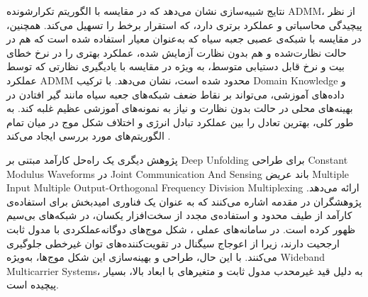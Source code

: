 نتایج شبیه‌سازی نشان می‌دهد که 
در مقایسه با الگوریتم تکرارشونده 
\gls{ADMM}،
از نظر پیچیدگی محاسباتی و عملکرد برتری دارد، که استقرار برخط را تسهیل می‌کند. همچنین، در مقایسه با شبکه‌ی عصبی جعبه سیاه که به‌عنوان معیار استفاده شده است که هم در حالت نظارت‌شده و هم بدون نظارت آزمایش شده،
عملکرد بهتری را در نرخ خطای بیت و نرخ قابل دستیابی متوسط، به ویژه در مقایسه با یادیگیری نظارتی که توسط عملکرد 
\gls{ADMM}
محدود شده است، نشان می‌دهد.
با ترکیب 
\gls{Domain Knowledge}
و داده‌های آموزشی، می‌تواند بر نقاط ضعف شبکه‌های جعبه سیاه مانند گیر افتادن در بهینه‌های محلی در حالت بدون نظارت و نیاز به نمونه‌های آموزشی عظیم غلبه کند. به طور کلی،
بهترین تعادل را بین عملکرد تبادل 
انرژی و اختلاف شکل موج در میان تمام الگوریتم‌های مورد بررسی ایجاد می‌کند
\cite{JointDesign}.

	پژوهش دیگری یک راه‌حل کارآمد مبتنی بر 
\gls{Deep Unfolding}
	 برای طراحی 
\glspl{Constant Modulus Waveform}
	  در 
\gls{Joint Communication And Sensing}
	   باند عریض 
\gls{Multiple Input Multiple Output-Orthogonal Frequency Division Multiplexing}
	   ارائه می‌دهد.
	پژوهشگران در مقدمه اشاره می‌کنند که 
	 به عنوان یک فناوری امیدبخش برای استفاده‌ی کارآمد از طیف محدود و استفاده‌ی مجدد از سخت‌افزار یکسان، در شبکه‌های بی‌سیم ظهور کرده است. در سامانه‌های عملی 
،
	  شکل موج‌های دوگانه‌عملکردی با مدول ثابت ارجحیت دارند، زیرا از اعوجاج سیگنال در تقویت‌کننده‌های توان غیرخطی جلوگیری می‌کنند. با این حال، طراحی و بهینه‌سازی این شکل موج‌ها، به‌ویژه 
\glspl{Wideband Multicarrier System}،
	   به دلیل قید غیرمحدب مدول ثابت و متغیرهای با ابعاد بالا، بسیار پیچیده است. 
	   
